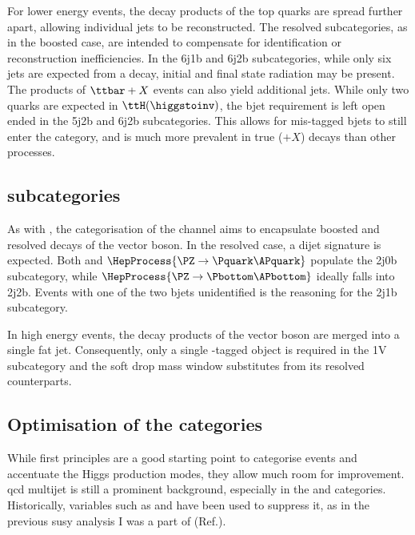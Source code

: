 For lower energy events, the decay products of the top quarks are spread further apart, allowing individual \glspl{jet} to be reconstructed. The \ttH resolved subcategories, as in the boosted case, are intended to compensate for identification or reconstruction inefficiencies. In the 6j1b and 6j2b subcategories, while only six \glspl{jet} are expected from a \ttbar decay, initial and final state radiation may be present. The products of $\ttbar + X$ events can also yield additional jets. While only two \Pbottom quarks are expected in $\ttH(\higgstoinv)$, the \gls{bjet} requirement is left open ended in the 5j2b and 6j2b subcategories. This allows for mis-tagged \glspl{bjet} to still enter the category, and is much more prevalent in true \ttbar ($+ X$) decays than other processes.




\subsection{\texorpdfstring{\VH}{VH} subcategories}
\label{subsec:htoinv_VH_subcats}

As with \ttH, the categorisation of the \VH channel aims to encapsulate boosted and resolved decays of the vector boson. In the resolved case, a dijet signature is expected. Both \PW and $\HepProcess{\PZ \to \Pquark\APquark}$ populate the 2j0b subcategory, while $\HepProcess{\PZ \to \Pbottom\APbottom}$ ideally falls into 2j2b. Events with one of the two \glspl{bjet} unidentified is the reasoning for the 2j1b subcategory.

In high energy events, the decay products of the vector boson are merged into a single fat jet. Consequently, only a single \PVec-tagged object is required in the 1V subcategory and the soft drop mass window substitutes \mjj from its resolved counterparts.




\subsection{Optimisation of the categories}
\label{subsec:htoinv_cat_optimisation}

While first principles are a good starting point to categorise events and accentuate the Higgs production modes, they allow much room for improvement. \acrshort{qcd} multijet is still a prominent background, especially in the \ttH and \ggH categories. Historically, variables such as \biasedDPhi and \alphat have been used to suppress it, as in the previous \acrlong{susy} analysis I was a part of (Ref.).


